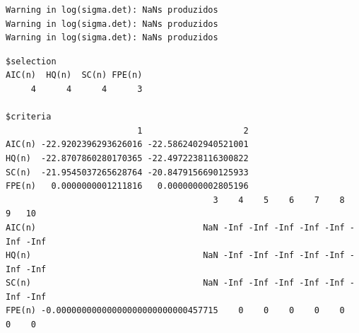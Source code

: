 \documentclass[
  letterpaper,
  DIV=11,
  numbers=noendperiod]{scrartcl}
\newenvironment{Shaded}{\begin{snugshade}}{\end{snugshade}}
\newcommand{\AttributeTok}[1]{\textcolor[rgb]{0.40,0.45,0.13}{#1}}
\newcommand{\CommentTok}[1]{\textcolor[rgb]{0.37,0.37,0.37}{#1}}
\newcommand{\DecValTok}[1]{\textcolor[rgb]{0.68,0.00,0.00}{#1}}
\newcommand{\FunctionTok}[1]{\textcolor[rgb]{0.28,0.35,0.67}{#1}}
\newcommand{\NormalTok}[1]{\textcolor[rgb]{0.00,0.23,0.31}{#1}}
\newcommand{\OtherTok}[1]{\textcolor[rgb]{0.00,0.23,0.31}{#1}}
\newcommand{\SpecialCharTok}[1]{\textcolor[rgb]{0.37,0.37,0.37}{#1}}
\begin{document}
\begin{verbatim}
Warning in log(sigma.det): NaNs produzidos
Warning in log(sigma.det): NaNs produzidos
Warning in log(sigma.det): NaNs produzidos
\end{verbatim}

\begin{verbatim}
$selection
AIC(n)  HQ(n)  SC(n) FPE(n) 
     4      4      4      3 

$criteria
                          1                    2
AIC(n) -22.9202396293626016 -22.5862402940521001
HQ(n)  -22.8707860280170365 -22.4972238116300822
SC(n)  -21.9545037265628764 -20.8479156690125933
FPE(n)   0.0000000001211816   0.0000000002805196
                                         3    4    5    6    7    8    9   10
AIC(n)                                 NaN -Inf -Inf -Inf -Inf -Inf -Inf -Inf
HQ(n)                                  NaN -Inf -Inf -Inf -Inf -Inf -Inf -Inf
SC(n)                                  NaN -Inf -Inf -Inf -Inf -Inf -Inf -Inf
FPE(n) -0.00000000000000000000000000457715    0    0    0    0    0    0    0
\end{verbatim}

\begin{Shaded}
\end{Shaded}
\end{document}
